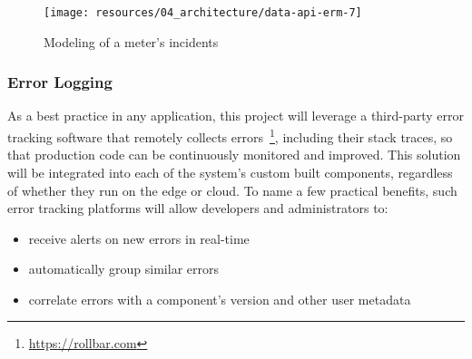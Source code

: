 \begin{figure}[hbt]
  \centering
  \texttt{[image: resources/04\_architecture/data-api-erm-7]}
  \caption{Modeling of a meter's incidents}
  \label{fig:data-api-erm-meter-incident}
\end{figure}

\FloatBarrier


\subsubsection{Error Logging}
\label{sec:error-logging}

As a best practice in any application, this project will leverage a third-party error tracking software that remotely collects errors~\footnote{\url{https://rollbar.com}}, including their stack traces, so that production code can be continuously monitored and improved. This solution will be integrated into each of the system's custom built components, regardless of whether they run on the edge or cloud. To name a few practical benefits, such error tracking platforms will allow developers and administrators to:

\begin{itemize}
  \item receive alerts on new errors in real-time
  \item automatically group similar errors
  \item correlate errors with a component's version and other user metadata
\end{itemize}
